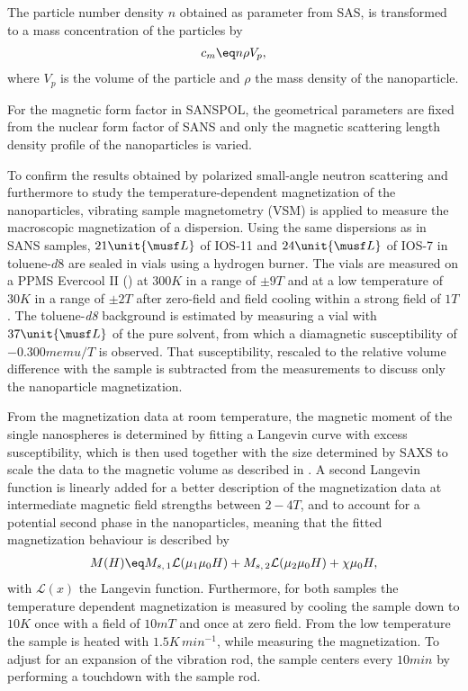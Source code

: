 \documentclass[\main/dresen_thesis.tex]{subfiles}
\begin{document}
    The particle number density $n$ obtained as parameter from SAS, is transformed to a mass concentration of the particles by
    \begin{align}
      c_m \eq n \rho V_p,
    \end{align}
    where $V_p$ is the volume of the particle and $\rho$ the mass density of the nanoparticle.

    For the magnetic form factor in SANSPOL, the geometrical parameters are fixed from the nuclear form factor of SANS and only the magnetic scattering length density profile of the nanoparticles is varied.

    To confirm the results obtained by polarized small-angle neutron scattering and furthermore to study the temperature-dependent magnetization of the nanoparticles, vibrating sample magnetometry (VSM) is applied to measure the macroscopic magnetization of a dispersion.
    Using the same dispersions as in SANS samples, $21 \unit{\musf L}$ of IOS-11 and $24 \unit{\musf L}$ of IOS-7 in toluene-$\mathit{d8}$ are sealed in vials using a hydrogen burner.
    The vials are measured on a PPMS Evercool II () at $300 \unit{K}$ in a range of $\pm 9 \unit{T}$ and at a low temperature of $30 \unit{K}$ in a range of $\pm 2 \unit{T}$ after zero-field and field cooling within a strong field of $1 \unit{T}$.
    The toluene-\textit{d8} background is estimated by measuring a vial with $37 \unit{\musf L}$ of the pure solvent, from which a diamagnetic susceptibility of $-0.300 \unit{memu/T}$ is observed.
    That susceptibility, rescaled to the relative volume difference with the sample is subtracted from the measurements to discuss only the nanoparticle magnetization.

    From the magnetization data at room temperature, the magnetic moment of the single nanospheres is determined by fitting a Langevin curve with excess susceptibility, which is then used together with the size determined by SAXS to scale the data to the magnetic volume as described in .
    A second Langevin function is linearly added for a better description of the magnetization data at intermediate magnetic field strengths between $2 - 4 \unit{T}$, and to account for a potential second phase in the nanoparticles, meaning that the fitted magnetization behaviour is described by
    \begin{align}
      M(H) \eq M_{s, \, 1} \mathcal{L} (\mu_{1} \mu_0 H) + M_{s, \, 2} \mathcal{L} (\mu_{2} \mu_0 H) + \chi \mu_0 H,
    \end{align}
    with $\mathcal{L}(x)$ the Langevin function.
    Furthermore, for both samples the temperature dependent magnetization is measured by cooling the sample down to $10 \unit{K}$ once with a field of $10 \unit{mT}$ and once at zero field.
    From the low temperature the sample is heated with $1.5 \unit{K \, min^{-1}}$, while measuring the magnetization.
    To adjust for an expansion of the vibration rod, the sample centers every $10 \unit{min}$ by performing a touchdown with the sample rod.
\end{document}
